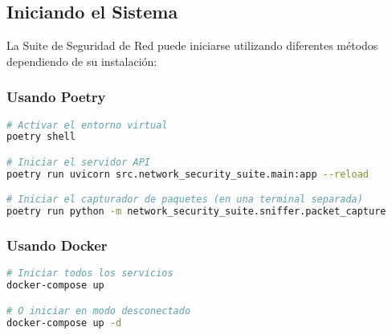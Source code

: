 \subsection{Iniciando el Sistema}
La Suite de Seguridad de Red puede iniciarse utilizando diferentes métodos dependiendo de su instalación:

\subsubsection{Usando Poetry}
\begin{lstlisting}[language=bash, caption=Iniciando con Poetry]
# Activar el entorno virtual
poetry shell

# Iniciar el servidor API
poetry run uvicorn src.network_security_suite.main:app --reload

# Iniciar el capturador de paquetes (en una terminal separada)
poetry run python -m network_security_suite.sniffer.packet_capture
\end{lstlisting}

\subsubsection{Usando Docker}
\begin{lstlisting}[language=bash, caption=Iniciando con Docker]
# Iniciar todos los servicios
docker-compose up

# O iniciar en modo desconectado
docker-compose up -d
\end{lstlisting}

